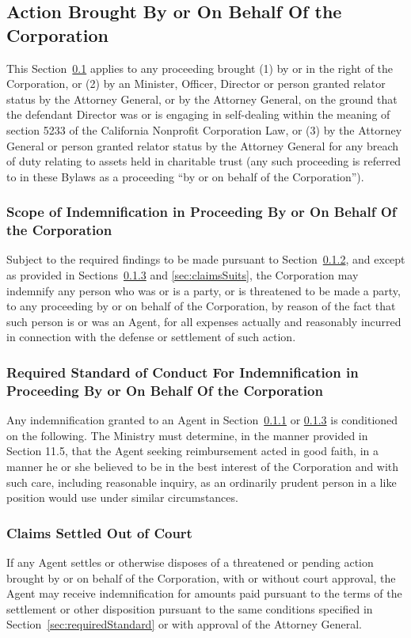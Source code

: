 \documentclass[letterpaper,titlepage]{article}
\begin{document}
\subsection{Action Brought By or On Behalf Of the Corporation}
\label{sec:actionBrought}
This Section~\ref{sec:actionBrought} applies to any proceeding brought (1) by
or in the right of the Corporation, or (2) by an Minister, Officer, Director or
person granted relator status by the Attorney General, or by the Attorney
General, on the ground that the defendant Director was or is engaging in
self-dealing within the meaning of section 5233 of the California Nonprofit
Corporation Law, or (3) by the Attorney General or person granted relator
status by the Attorney General for any breach of duty relating to assets held
in charitable trust (any such proceeding is referred to in these Bylaws as a
proceeding “by or on behalf of the Corporation”). 
\subsubsection{Scope of Indemnification in Proceeding By or On Behalf Of the
Corporation}
\label{sec:scopeIndemnificationProceeding}
Subject to the required findings to be made pursuant to
Section~\ref{sec:requiredStandardBy}, and except as provided in
Sections~\ref{sec:claimsSettled} and \ref{sec:claimsSuits}, the Corporation may
indemnify any person who was or is a party, or is threatened to be made a
party, to any proceeding by or on behalf of the Corporation, by reason of the
fact that such person is or was an Agent, for all expenses actually and
reasonably incurred in connection with the defense or settlement of such
action. 
\subsubsection{Required Standard of Conduct For Indemnification in Proceeding By or On Behalf Of the Corporation}
\label{sec:requiredStandardBy}
Any indemnification granted to an Agent in
Section~\ref{sec:scopeIndemnificationProceeding} or \ref{sec:claimsSettled} is
conditioned on the following. The Ministry must determine, in the manner
provided in Section 11.5, that the Agent seeking reimbursement acted in good
faith, in a manner he or she believed to be in the best interest of the
Corporation and with such care, including reasonable inquiry, as an ordinarily
prudent person in a like position would use under similar circumstances. 
\subsubsection{Claims Settled Out of Court}
\label{sec:claimsSettled}
If any Agent settles or otherwise disposes of a threatened or pending action
brought by or on behalf of the Corporation, with or without court approval, the
Agent may receive indemnification for amounts paid pursuant to the terms of the
settlement or other disposition pursuant to the same conditions specified in
Section~\ref{sec:requiredStandard} or with approval of the Attorney General. 
\end{document}
